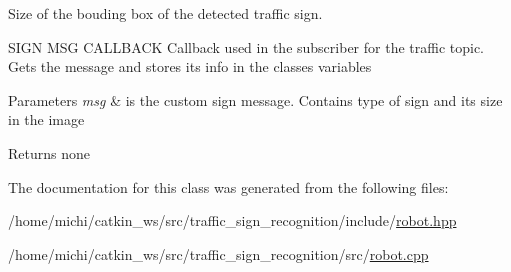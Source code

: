 Size of the bouding box of the detected traffic sign. 

S\+I\+GN M\+SG C\+A\+L\+L\+B\+A\+CK Callback used in the subscriber for the traffic topic. Gets the message and stores its info in the classes variables 
\begin{DoxyParams}{Parameters}
{\em msg} & is the custom sign message. Contains type of sign and its size in the image \\
\hline
\end{DoxyParams}
\begin{DoxyReturn}{Returns}
none 
\end{DoxyReturn}


The documentation for this class was generated from the following files\+:\begin{DoxyCompactItemize}
\item 
/home/michi/catkin\+\_\+ws/src/traffic\+\_\+sign\+\_\+recognition/include/\hyperlink{robot_8hpp}{robot.\+hpp}\item 
/home/michi/catkin\+\_\+ws/src/traffic\+\_\+sign\+\_\+recognition/src/\hyperlink{robot_8cpp}{robot.\+cpp}\end{DoxyCompactItemize}
